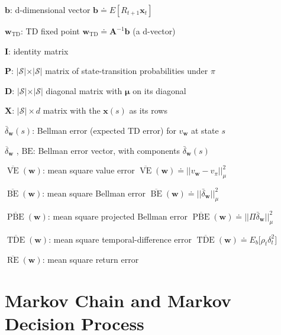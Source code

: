\documentclass{article}
\begin{document}
$\mathbf { b }$: d-dimensional vector $\mathbf { b } \doteq E [ R _ { t + 1 } \mathbf { x } _ { t } ]$

$\mathbf { w } _ { \mathrm { T D } }$: TD fixed point $\mathbf { w } _ { \mathrm { T D } } \doteq \mathbf { A } ^ { - 1 } \mathbf { b }$ (a d-vector)

$\mathbf { I }$: identity matrix

$\mathbf { P }$: $\vert \mathcal{S} \vert \times \vert \mathcal{S} \vert$ matrix of state-transition probabilities under $\pi$

$\mathbf { D }$: $\vert \mathcal{S} \vert \times \vert \mathcal{S} \vert$ diagonal matrix with $\boldsymbol{\mu}$ on its diagonal

$\mathbf { X }$: $\vert \mathcal{S} \vert \times d$ matrix with the $\mathbf { x } ( s )$ as its rows 

$\bar { \delta } _ { \mathbf { w } } ( s )$: Bellman error (expected TD error) for $v _ { \mathbf { w } }$ at state $s$

$\overline { { \delta } } _ { \mathbf { w } }$ , $\mathrm { BE }$: Bellman error vector, with components $\bar { \delta } _ { \mathbf { w } } ( s )$

$\overline { { \operatorname { V E } } } ( \mathbf { w } )$: mean square value error $\overline { { \operatorname { V E } } } ( \mathbf { w } ) \doteq \vert \vert v _ { \mathbf { w } } - v _ { \pi } \vert \vert _ { \mu } ^ { 2 }$

$\overline { { \operatorname { B E } } } ( \mathbf { w } )$: mean square Bellman error $\overline { { \operatorname { B E } } } ( \mathbf { w } ) \doteq \vert \vert \bar { \delta } _ { \mathbf { w } } \vert \vert _ { \mu } ^ { 2 }$

$\overline { { \operatorname { P B E } } } ( \mathbf { w } )$: mean square projected Bellman error $\overline { { \operatorname { P B E } } } ( \mathbf { w } ) \doteq \vert \vert \Pi \bar { \delta } _ { \mathbf { w } } \vert \vert _ { \mu } ^ { 2 }$

$\overline { { \operatorname { T D E } } } ( \mathbf { w } )$: mean square temporal-difference error $\overline { { \operatorname { T D E } } } ( \mathbf { w } ) \doteq E _ { b } \big [ \rho _ { t } \delta _ { t } ^ { 2 } \big ]$

$\overline { { \operatorname { R E } } } ( \mathbf { w } )$: mean square return error

\section{Markov Chain and Markov Decision Process}
\end{document}
